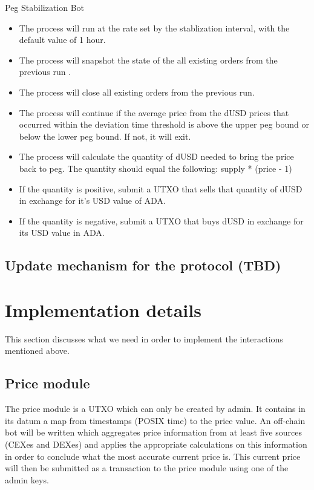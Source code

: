 \documentclass{article} %
\begin{document}
Peg Stabilization Bot
\begin{itemize}
  \item The process will run at the rate set by the stablization interval, with
   the default value of 1 hour.
  \item The process will snapshot the state of the all existing orders from the previous run
    .
  \item The process will close all existing orders from the previous run.
  \item The process will continue if the average price from the dUSD prices
   that occurred within the deviation time threshold is above the upper peg
   bound or below the lower peg bound. If not, it will exit.
  \item The process will calculate the quantity of dUSD needed to bring the price
   back to peg. The quantity should equal the following: supply * (price - 1)
  \item If the quantity is positive, submit a UTXO that sells that quantity of dUSD
   in exchange for it's USD value of ADA.
  \item If the quantity is negative, submit a UTXO that buys dUSD in exchange for
   its USD value in ADA.
\end{itemize}

\subsection{Update mechanism for the protocol (TBD)}

\section{Implementation details}

This section discusses what we need in order to implement the interactions
mentioned above.

\subsection{Price module}

The price module is a UTXO which can only be created by admin.
It contains in its datum a map from timestamps (POSIX time) to the price value.
An off-chain bot will be written which aggregates price information from at
least five sources (CEXes and DEXes) and applies the appropriate calculations on
this information in order to conclude what the most accurate current price is.
This current price will then be submitted as a transaction to the price module
using one of the admin keys. \\
\end{document}
